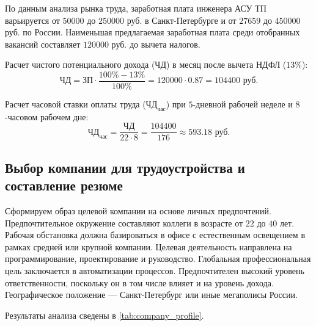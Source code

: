 По данным анализа рынка труда, заработная плата инженера АСУ ТП варьируется от $50000$ до $250000$ руб. в Санкт-Петербурге и от $27659$ до $450000$ руб. по России. Наименьшая предлагаемая заработная плата среди отобранных вакансий составляет $120000$ руб. до вычета налогов.

Расчет чистого потенциального дохода (ЧД) в месяц после вычета НДФЛ ($13\%$):
\begin{equation}
    \text{ЧД} = \text{ЗП} \cdot \frac{100\% - 13\%}{100\%} = 120000 \cdot 0.87 = 104400 \text{ руб.}
\end{equation}

Расчет часовой ставки оплаты труда ($\text{ЧД}_{\text{час}}$) при $5$-дневной рабочей неделе и $8$-часовом рабочем дне:
\begin{equation}
    \text{ЧД}_{\text{час}} = \frac{\text{ЧД}}{22 \cdot 8} = \frac{104400}{176} \approx 593.18 \text{ руб.}
\end{equation}

\subsection{Выбор компании для трудоустройства и составление резюме}
Сформируем образ целевой компании на основе личных предпочтений. Предпочтительное окружение составляют коллеги в возрасте от $22$ до $40$ лет. Рабочая обстановка должна базироваться в офисе с естественным освещением в рамках средней или крупной компании. Целевая деятельность направлена на программирование, проектирование и руководство. Глобальная профессиональная цель заключается в автоматизации процессов. Предпочтителен высокий уровень ответственности, поскольку он в том числе влияет и на уровень дохода. Географическое положение --- Санкт-Петербург или иные мегаполисы России. 

Результаты анализа сведены в \cref{tab:company_profile}.


